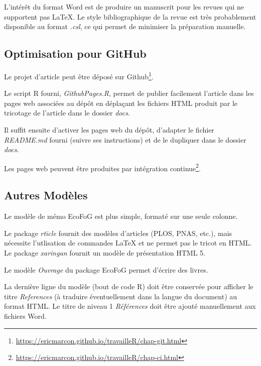 \documentclass[fleqn,10pt]{latex/stylish_article} %
\begin{document}
L'intérêt du format Word est de produire un manuscrit pour les revues qui ne supportent pas LaTeX.
Le style bibliographique de la revue est très probablement disponible au format \emph{.csl}, ce qui permet de minimiser la préparation manuelle.

\hypertarget{optimisation-pour-github}{%
\subsection{Optimisation pour GitHub}\label{optimisation-pour-github}}

Le projet d'article peut être déposé sur Github\footnote{\url{https://ericmarcon.github.io/travailleR/chap-git.html}}.

Le script R fourni, \emph{GithubPages.R}, permet de publier facilement l'article dans les pages web associées au dépôt en déplaçant les fichiers HTML produit par le tricotage de l'article dans le dossier \emph{docs}.

Il suffit ensuite d'activer les pages web du dépôt, d'adapter le fichier \emph{README.md} fourni (suivre ses instructions) et de le dupliquer dans le dossier \emph{docs}.

Les pages web peuvent être produites par intégration continue\footnote{\url{https://ericmarcon.github.io/travailleR/chap-ci.html}}.

\hypertarget{autres-moduxe8les}{%
\subsection{Autres Modèles}\label{autres-moduxe8les}}

Le modèle de mémo EcoFoG est plus simple, formaté sur une seule colonne.

Le package \emph{rticle} fournit des modèles d'articles (PLOS, PNAS, etc.), mais nécessite l'utlisation de commandes LaTeX et ne permet pas le tricot en HTML.
Le package \emph{xaringan} fournit un modèle de présentation HTML 5.

Le modèle \emph{Ouvrage} du package EcoFoG permet d'écrire des livres.

La dernière ligne du modèle (bout de code R) doit être conservée pour afficher le titre \emph{References} (à traduire éventuellement dans la langue du document) au format HTML.
Le titre de niveau 1 \emph{Références} doit être ajouté manuellement aux fichiers Word.



\makeatletter

\makeatother


\end{document}
